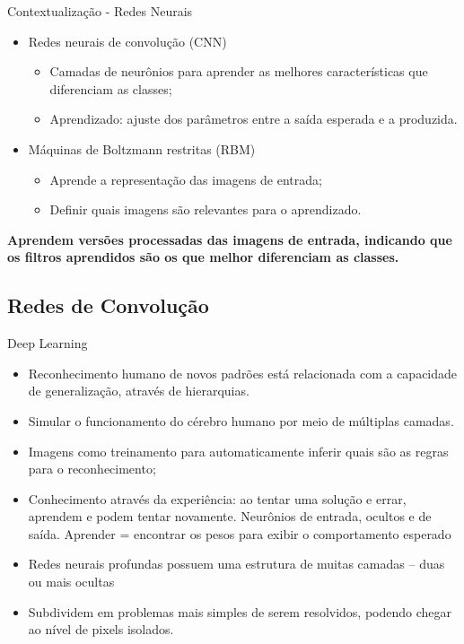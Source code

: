 \documentclass{beamer}
\begin{document}
\begin{frame}{Contextualização - Redes Neurais}
\justifying
  \begin{itemize}
    \item Redes neurais de convolução (CNN)
    \begin{itemize}
        \item Camadas de neurônios para aprender as melhores características que diferenciam as classes;
        \item Aprendizado: ajuste dos parâmetros entre a saída esperada e a produzida.
    \end{itemize}
    \item Máquinas de Boltzmann restritas (RBM)
    \begin{itemize}
        \item Aprende a representação das imagens de entrada;
        \item Definir quais imagens são relevantes para o aprendizado.
    \end{itemize}
  \end{itemize}
 \textbf{Aprendem versões processadas das imagens de entrada, indicando que os filtros aprendidos são os que melhor diferenciam as classes.}
\end{frame}
\subsection{Redes de Convolução}
\begin{frame}{Deep Learning}
\begin{itemize}
  \item Reconhecimento humano de novos padrões está relacionada com a capacidade de generalização, através de hierarquias.%
  \item Simular o funcionamento do cérebro humano por meio de múltiplas camadas.
  \item Imagens como treinamento para automaticamente inferir quais são as regras para o reconhecimento;
  \item Conhecimento através da experiência: ao tentar uma solução e errar, aprendem e podem tentar novamente. Neurônios de entrada, ocultos e de saída. Aprender = encontrar os pesos para exibir o comportamento esperado%
  \item Redes neurais profundas possuem uma estrutura de muitas camadas -- duas ou mais ocultas %
  \item Subdividem em problemas mais simples de serem resolvidos, podendo chegar ao nível de pixels isolados.
\end{itemize}


\end{frame}
\end{document}
